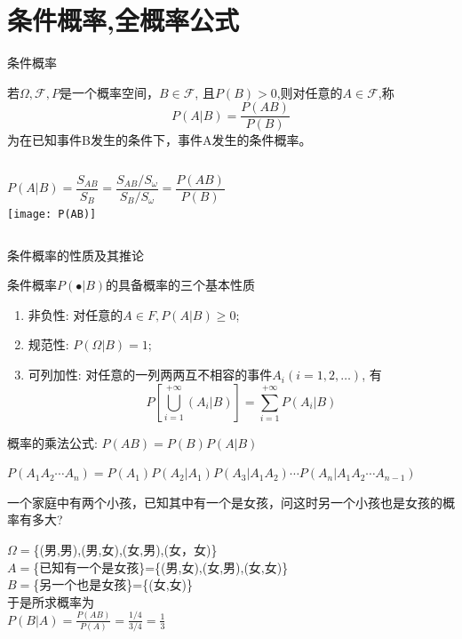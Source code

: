 \section{条件概率,全概率公式}

\begin{frame}{条件概率}
\begin{definition}
	若$\Omega,\mathcal{F},P$是一个概率空间，$B\in\mathcal{F}$, 且$P(B)>0$,则对任意的$A\in\mathcal{F}$,称
	$$P(A|B)=\frac{P(AB)}{P(B)}$$
	为在已知事件B发生的条件下，事件A发生的条件概率。
\end{definition}

\begin{columns}%
\[P(A|B)=\frac{S_{AB}}{S_B}=\frac{S_{AB}/S_\omega}{S_B/S_\omega}=\frac{P(AB)}{P(B)} \]
\texttt{[image: P(AB)]}
\end{columns}
\end{frame}

\begin{frame}{条件概率的性质及其推论}
\begin{block}{条件概率$P(\bullet|B)$的具备概率的三个基本性质}
	\begin{enumerate}
		\item 非负性: 对任意的$A\in F, P(A|B)\ge 0$;
		\item 规范性: $P(\Omega|B)=1$;
		\item 可列加性: 对任意的一列两两互不相容的事件$A_i(i=1,2,\dots)$, 有
		\[P\left[\bigcup\limits_{i=1}^{+\infty}(A_i|B)\right]=\sum\limits_{i=1}^{+\infty}P(A_i|B) \]
	\end{enumerate}
\end{block}
\begin{corollary}
概率的乘法公式:  $P(AB)=P(B)P(A|B)$
\end{corollary}

\begin{corollary}
	$P(A_1A_2\cdots A_n)=P(A_1)P(A_2|A_1)P(A_3|A_1A_2)\cdots P(A_n|A_1A_2\cdots A_{n-1})$
\end{corollary}
\end{frame}

\begin{frame}
\begin{example}
	一个家庭中有两个小孩，已知其中有一个是女孩，问这时另一个小孩也是女孩的概率有多大?
	
	\medskip
	$\Omega=$\{(男,男),(男,女),(女,男),(女，女)\}\\
	$A=$\{已知有一个是女孩\}=\{(男,女),(女,男),(女,女)\}\\
	$B=$\{另一个也是女孩\}=\{(女,女)\}\\
	于是所求概率为\\
	$P(B|A)=\frac{P(AB)}{P(A)}=\frac{1/4}{3/4}=\frac{1}{3}$
\end{example}
\end{frame}

